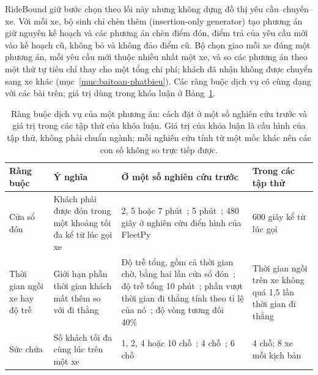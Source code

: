 RideBound giữ bước chọn theo lối này nhưng không dựng đồ thị yêu cầu--chuyến--xe. Với mỗi xe, bộ sinh chỉ chèn thêm
(insertion-only generator) tạo phương án giữ nguyên kế hoạch và các phương án chèn điểm đón, điểm trả của yêu cầu mới
vào kế hoạch cũ, không bỏ và không đảo điểm cũ. Bộ chọn giao mỗi xe đúng một phương án, mỗi yêu cầu mới thuộc nhiều
nhất một xe, và so các phương án theo một thứ tự tiêu chí thay cho một tổng chi phí; khách đã nhận không được chuyển
sang xe khác (mục~\ref{muc:baitoan-phatbieu}). Các ràng buộc dịch vụ có cùng dạng với các bài trên; giá trị dùng
trong khóa luận ở Bảng~\ref{bang:c2-dichvu}.

\begin{table}[htbp]
\centering
\caption{Ràng buộc dịch vụ của một phương án: cách đặt ở một số nghiên cứu trước và giá trị trong các tập thử của
khóa luận. Giá trị của khóa luận là cấu hình của tập thử, không phải chuẩn ngành; mỗi nghiên cứu tính từ một mốc
khác nên các con số không so trực tiếp được.}
\label{bang:c2-dichvu}
\small
\begin{tabular}{@{}p{2.4cm}p{3.4cm}p{5.9cm}p{3.1cm}@{}}
\toprule
\textbf{Ràng buộc} & \textbf{Ý nghĩa} & \textbf{Ở một số nghiên cứu trước} & \textbf{Trong các tập thử}\\
\midrule
Cửa sổ đón & Khách phải được đón trong một khoảng tối đa kể từ lúc gọi xe & 2, 5 hoặc 7
phút~\cite{alonsomora2017}; 5 phút~\cite{fielbaum2020,elmi2026}; 480 giây ở nghiên cứu điển hình của
FleetPy~\cite{engelhardt2026} & 600 giây kể từ lúc gọi\\
Thời gian ngồi xe hay độ trễ & Giới hạn phần thời gian khách mất thêm so với đi thẳng & Độ trễ tổng, gồm cả thời gian
chờ, bằng hai lần cửa sổ đón~\cite{alonsomora2017}; độ trễ tổng 10 phút~\cite{fielbaum2020,elmi2026}; phần vượt thời
gian đi thẳng tính theo tỉ lệ của nó~\cite{molenbruch2017}; độ vòng tương đối 40\%~\cite{engelhardt2026} & Thời gian
ngồi trên xe không quá 1,5 lần thời gian đi thẳng\\
Sức chứa & Số khách tối đa cùng lúc trên một xe & 1, 2, 4 hoặc 10 chỗ~\cite{alonsomora2017}; 4
chỗ~\cite{engelhardt2026}; 6 chỗ~\cite{schulz2026} & 4 chỗ; 8 xe mỗi kịch bản\\
\bottomrule
\end{tabular}
\end{table}

